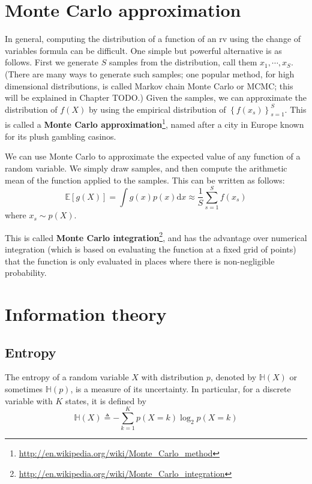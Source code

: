 \section{Monte Carlo approximation}
\label{sec:Monte-Carlo-approximation}
In general, computing the distribution of a function of an rv using the change of variables formula can be difficult. One simple but powerful alternative is as follows. First we generate $S$ samples from the distribution, call them $x_1,\cdots,x_S$. (There are many ways to generate such samples; one popular method, for high dimensional distributions, is called Markov chain Monte Carlo or MCMC; this will be explained in Chapter TODO.) Given the samples, we can approximate the distribution of $f(X)$ by using the empirical distribution of $\left\{f(x_s)\right\}_{s=1}^S$. This is called a \textbf{Monte Carlo approximation}\footnote{\url{http://en.wikipedia.org/wiki/Monte_Carlo_method}}, named after a city in Europe known for its plush gambling casinos.

We can use Monte Carlo to approximate the expected value of any function of a random variable. We simply draw samples, and then compute the arithmetic mean of the function applied to the samples. This can be written as follows:
\begin{equation}
\mathbb{E}[g(X)]=\int g(x)p(x)\mathrm{d}x \approx \dfrac{1}{S}\sum\limits_{s=1}^S f(x_s)
\end{equation}
where $x_s \sim p(X)$.

This is called \textbf{Monte Carlo integration}\footnote{\url{http://en.wikipedia.org/wiki/Monte_Carlo_integration}}, and has the advantage over numerical integration (which is based on evaluating the function at a fixed grid of points) that the function is only evaluated in places where there is non-negligible probability.


\section{Information theory}

\subsection{Entropy}
\label{sec:Entropy}
The entropy of a random variable $X$ with distribution $p$, denoted by $\mathbb{H}(X)$ or sometimes $\mathbb{H}(p)$, is a measure of its uncertainty. In particular, for a discrete variable with $K$ states, it is defined by
\begin{equation}
\mathbb{H}(X) \triangleq -\sum\limits_{k=1}^{K}{p(X=k)\log_2p(X=k)}
\end{equation}

